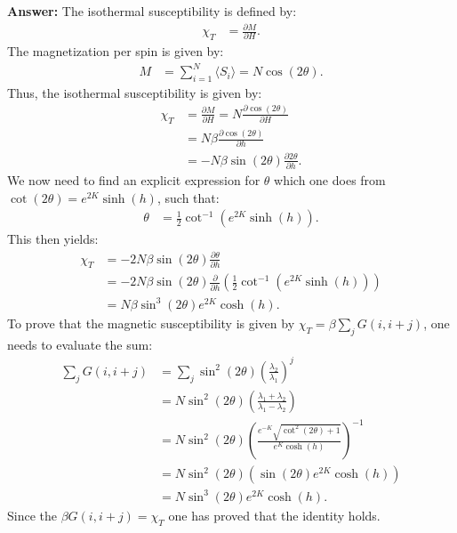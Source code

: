 \documentclass[a4paper]{article}
\newcommand{\newparagraph}{\vspace{.5cm}\noindent}
\newcommand{\fpartial}[2]{\frac{\partial #1}{\partial #2}}
\newcommand{\average}[1]{\langle #1 \rangle}
\begin{document}
\newparagraph
\textbf{Answer:} The isothermal susceptibility is defined by:
\begin{align*}
    \chi_T &= \fpartial{M}{H}.
\end{align*}The magnetization per spin is given by:
\begin{align*}
    M &= \sum_{i = 1}^N\average{S_i} = N\cos(2\theta).
\end{align*}Thus, the isothermal susceptibility is given by:
\begin{align*}
    \chi_T &= \fpartial{M}{H} = N\fpartial{\cos(2\theta)}{H}\\
    &= N\beta\fpartial{\cos(2\theta)}{h}\\
    &= -N\beta\sin(2\theta)\fpartial{2\theta}{h}.
\end{align*}We now need to find an explicit expression for $\theta$ which one does from $\cot(2\theta) = e^{2K}\sinh(h)$, such that:
\begin{align*}
    \theta &= \frac{1}{2}\cot^{-1}\left(e^{2K}\sinh(h)\right).
\end{align*}This then yields:
\begin{align*}
    \chi_T &=-2N\beta\sin(2\theta)\fpartial{\theta}{h}\\
    &= -2N\beta\sin\left(2\theta\right)\fpartial{}{h}\left(\frac{1}{2}\cot^{-1}\left(e^{2K}\sinh(h)\right)\right)\\
    &= N\beta\sin^3\left(2\theta\right)e^{2K}\cosh(h).
\end{align*}
To prove that the magnetic susceptibility is given by $\chi_T = \beta\sum_j G(i, i+j)$, one needs to evaluate the sum:
\begin{align*}
    \sum_j G(i, i+j) &= \sum_j \sin^2\left(2\theta\right)\left(\frac{\lambda_2}{\lambda_1}\right)^j\\
    &= N\sin^2\left(2\theta\right)\left(\frac{\lambda_1 + \lambda_2}{\lambda_1 - \lambda_2}\right)\\
    &= N\sin^2\left(2\theta\right)\left(\frac{e^{-K}\sqrt{\cot^2(2\theta) + 1}}{e^{K}\cosh(h)}\right)^{-1}\\
    &= N\sin^2\left(2\theta\right)\left(\sin(2\theta)e^{2K}\cosh(h)\right)\\
    &= N\sin^3\left(2\theta\right)e^{2K}\cosh(h).
\end{align*}Since the $\beta G(i, i+j) = \chi_T$ one has proved that the identity holds.
\end{document}
